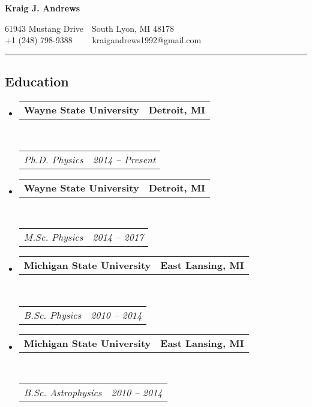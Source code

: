 \documentclass[10pt,letterpaper]{article}
\makeatletter
\newcommand{\headerrow}[2]
{\begin{tabular*}{\linewidth}{l@{\extracolsep{\fill}}r}
	#1 &
	#2 \\
\end{tabular*}}
\makeatother
\begin{document}
\begin{center}
{\LARGE \textbf{Kraig J. Andrews}}

61943 Mustang Drive\ \ \textbullet South Lyon, MI 48178
\\
+1 (248) 798-9388\ \ \textbullet
\ \ kraigandrews1992@gmail.com
\end{center}

\hrule
\vspace{-0.4em}
\subsection*{Education}

\begin{itemize}
	\parskip=0.1em

    \item 
    \headerrow
        {\textbf{Wayne State University}}
        {\textbf{Detroit, MI}}
    \\
    \headerrow
        {\emph{Ph.D. Physics}}
        {\emph{2014 -- Present}}
    
    \item 
    \headerrow
        {\textbf{Wayne State University}}
        {\textbf{Detroit, MI}}
    \\
    \headerrow
	{\emph{M.Sc. Physics}}
        {\emph{2014 -- 2017}}

	\item 
	\headerrow
	{\textbf{Michigan State University}}
	{\textbf{East Lansing, MI}}
	\\
	\headerrow
	{\emph{B.Sc. Physics}}
        {\emph{2010 -- 2014}}
    
    \item 
    \headerrow
        {\textbf{Michigan State University}}
        {\textbf{East Lansing, MI}}
    \\
    \headerrow
        {\emph{B.Sc. Astrophysics}}
        {\emph{2010 -- 2014}}

\end{itemize}
\end{document}
